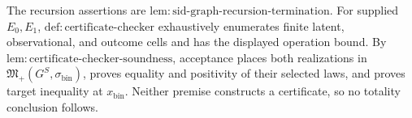 The recursion assertions are \(\mathrm{lem:sid\text{-}graph\text{-}recursion\text{-}termination}\). For supplied \(E_0,E_1\), \(\mathrm{def:certificate\text{-}checker}\) exhaustively enumerates finite latent, observational, and outcome cells and has the displayed operation bound. By \(\mathrm{lem:certificate\text{-}checker\text{-}soundness}\), acceptance places both realizations in \(\mathfrak M_+(G^S,\sigma_{\mathrm{bin}})\), proves equality and positivity of their selected laws, and proves target inequality at \(x_{\mathrm{bin}}\). Neither premise constructs a certificate, so no totality conclusion follows.